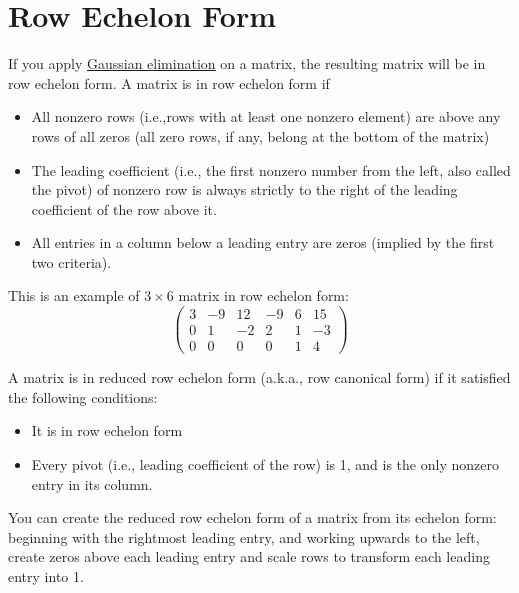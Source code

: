 \documentclass[conference,final,11pt,technote,onecolumn]{IEEEtran}\usepackage[]{graphicx}\usepackage[]{color}
\begin{document}
\section{Row Echelon Form}
\label{term:row_echelon_form}
If you apply \hyperref[term:gauss_jordan_elimination_algorithm]{Gaussian elimination} on a matrix, the resulting  matrix will be in row echelon form. A matrix is in row echelon form if
\begin{itemize}
  \item All nonzero rows (i.e.,rows with at least one nonzero element) are above any rows of all zeros (all zero rows, if any, belong at the bottom of the matrix)
  \item The leading coefficient (i.e., the first nonzero number from the left, also called the pivot) of nonzero row is always strictly to the right of the leading coefficient of the row above it.
  \item All entries in a column below a leading entry are zeros (implied by the first two criteria).
\end{itemize}
This is an example of $3\times 6$ matrix in row echelon form:
\[ 
\begin{pmatrix}
    	3 & -9 & 12 & -9 & 6 & 15 \\
      0 & 1  & -2 & 2 & 1  & -3\\
      0 & 0 & 0 & 0 & 1 & 4
			\end{pmatrix}
\]

A matrix is in reduced row echelon form (a.k.a., row canonical form) if it satisfied the following conditions:
\begin{itemize}
  \item It is in row echelon form
  \item Every pivot (i.e., leading coefficient of the row) is 1, and is the only nonzero entry in its column.
\end{itemize}
You can create the reduced row echelon form of a matrix from its echelon form: beginning with the rightmost leading entry, and working upwards to the left, create zeros above each leading entry and scale rows to transform each leading entry into 1.
\end{document}
